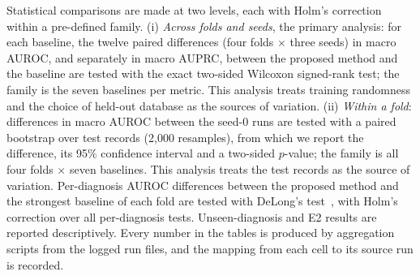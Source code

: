 Statistical comparisons are made at two levels, each with Holm's correction within a pre-defined family. (i) \emph{Across folds and seeds}, the primary analysis: for each baseline, the twelve paired differences (four folds $\times$ three seeds) in macro AUROC, and separately in macro AUPRC, between the proposed method and the baseline are tested with the exact two-sided Wilcoxon signed-rank test; the family is the seven baselines per metric. This analysis treats training randomness and the choice of held-out database as the sources of variation. (ii) \emph{Within a fold}: differences in macro AUROC between the seed-0 runs are tested with a paired bootstrap over test records (2{,}000 resamples), from which we report the difference, its 95\% confidence interval and a two-sided $p$-value; the family is all four folds $\times$ seven baselines. This analysis treats the test records as the source of variation. Per-diagnosis AUROC differences between the proposed method and the strongest baseline of each fold are tested with DeLong's test~\cite{delong1988}, with Holm's correction over all per-diagnosis tests. Unseen-diagnosis and E2 results are reported descriptively. Every number in the tables is produced by aggregation scripts from the logged run files, and the mapping from each cell to its source run is recorded.
